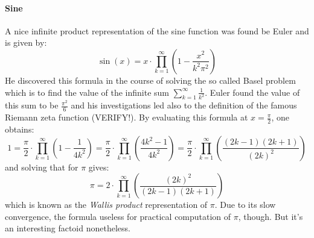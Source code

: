 
%


\paragraph{Sine}
A nice infinite product representation of the sine function was found be Euler and is given by:
\begin{equation}
 \sin(x) = x \cdot \prod_{k=1}^{\infty} \left( 1 - \frac{x^2}{k^2 \pi^2}  \right)
\end{equation}
He discovered this formula in the course of solving the so called Basel problem which is to find the value of the infinite sum $\sum_{k=1}^{\infty} \frac{1}{k^2}$. Euler found the value of this sum to be $\frac{\pi^2}{6}$ and his investigations led also to the definition of the famous Riemann zeta function (VERIFY!). By evaluating this formula at $x = \frac{\pi}{2}$, one obtains:
\begin{equation}
 1 = \frac{\pi}{2} \cdot \prod_{k=1}^{\infty} \left( 1 - \frac{1}{4 k^2}  \right)
   = \frac{\pi}{2} \cdot \prod_{k=1}^{\infty} \left( \frac{4 k^2 - 1}{4 k^2}  \right)
   = \frac{\pi}{2} \cdot \prod_{k=1}^{\infty} \left( \frac{(2k-1)(2k+1)}{(2k)^2}  \right)   
\end{equation}
and solving that for $\pi$ gives:
\begin{equation}
\pi = 2 \cdot \prod_{k=1}^{\infty} \left( \frac{(2k)^2 }{(2k-1)(2k+1)} \right)   
\end{equation}
which is known as the \emph{Wallis product} representation of $\pi$. Due to its slow convergence, the formula useless for practical computation of $\pi$, though. But it's an interesting factoid nonetheless. 

